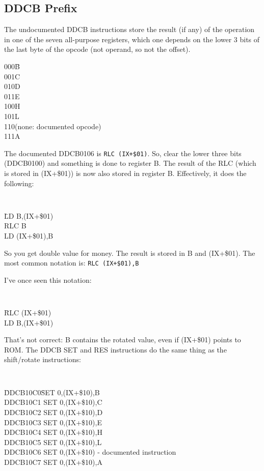 \documentclass[twoside,openright,a4paper]{book}
\begin{document}
\subsection{DDCB Prefix}
\label{prefix_cbdd}

The undocumented DDCB instructions store the result (if any) of the operation in one of the seven all-purpose registers, which one depends on the lower 3 bits of the last byte of the opcode (not operand, so not the offset).

\begin{tabbing}
	{\qquad}000\quad\=B\\
	{\qquad}001\>C\\
	{\qquad}010\>D\\
	{\qquad}011\>E\\
	{\qquad}100\>H\\
	{\qquad}101\>L\\
	{\qquad}110\>(none: documented opcode)\\
	{\qquad}111\>A
\end{tabbing}

The documented DDCB0106 is {\tt RLC (IX+\$01)}. So, clear the lower three bits (DDCB0100) and something is done to register B. The result of the RLC (which is stored in (IX+\$01)) is now also stored in register B. Effectively, it does the following:

{\tt 
	\begin{tabbing}
		{\qquad}\=LD B,(IX+\$01)\+\\
		RLC B\\
		LD (IX+\$01),B
	\end{tabbing}
}

So you get double value for money. The result is stored in B and (IX+\$01). The most common notation is: {\tt RLC (IX+\$01),B}

I've once seen this notation:
 
{\tt 
	\begin{tabbing}
		{\qquad}\=RLC (IX+\$01)\+\\
		LD B,(IX+\$01)
	\end{tabbing}
}

That's not correct: B contains the rotated value, even if (IX+\$01) points to ROM. The DDCB SET and RES instructions do the same thing as the shift/rotate instructions:

{\tt 
	\begin{tabbing}
		{\qquad}\=DDCB10C0{\qquad}\=SET 0,(IX+\$10),B\+\\
		DDCB10C1	\>SET 0,(IX+\$10),C\\
		DDCB10C2	\>SET 0,(IX+\$10),D\\
		DDCB10C3	\>SET 0,(IX+\$10),E\\
		DDCB10C4	\>SET 0,(IX+\$10),H\\
		DDCB10C5	\>SET 0,(IX+\$10),L\\
		DDCB10C6	\>SET 0,(IX+\$10) {\rm - documented instruction}\\
		DDCB10C7	\>SET 0,(IX+\$10),A
	\end{tabbing}
}
\end{document}
